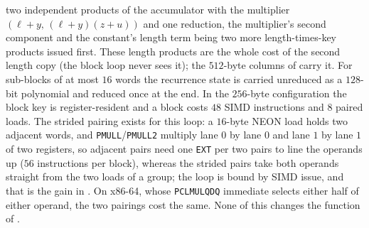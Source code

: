 \begin{remark}
\begin{enumerate}[label=(A\arabic*)]
\[      \]
      two independent products of the accumulator with the multiplier
      $(\ell+y,\,(\ell+y)(z+u))$ and one reduction, the multiplier's second
      component and the constant's length term being two more
      length-times-key products issued first.  These length products are the
      whole cost of the second length copy (the block loop never sees it);
      the $512$-byte columns of  carry
      it.  For sub-blocks of at most $16$ words the
      recurrence state is carried unreduced as a $128$-bit polynomial and
      reduced once at the end.  In the $256$-byte configuration the block
      key is register-resident and a block costs $48$ SIMD instructions and
      $8$ paired loads.  The strided pairing exists for this loop: a
      $16$-byte NEON load holds two adjacent words, and
      \texttt{PMULL}/\texttt{PMULL2} multiply lane $0$ by lane $0$ and lane
      $1$ by lane $1$ of two registers, so adjacent pairs need one
      \texttt{EXT} per two pairs to line the operands up ($56$ instructions
      per block), whereas the strided pairs take both operands straight from
      the two loads of a group; the loop is bound by SIMD issue, and that
      is the gain in .  On x86-64, whose
      \texttt{PCLMULQDQ} immediate selects either half of either operand,
      the two pairings cost the same.  None of this changes the function of
      .
\end{enumerate}
\end{remark}
